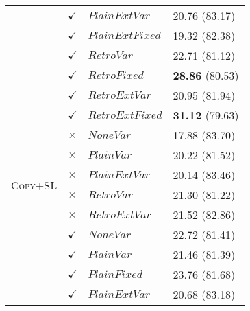 \begin{table}
\begin{tabular}{|l|l|l|l| }
 & $\checkmark$ & $PlainExtVar$  & 20.76 (83.17) \\
 & $\checkmark$ & $PlainExtFixed$  & 19.32 (82.38) \\
 & $\checkmark$ & $RetroVar$ &  22.71 (81.12) \\
 & $\checkmark$ & $RetroFixed$ &  \textbf{28.86} (80.53) \\
 & $\checkmark$ & $RetroExtVar$  & 20.95 (81.94) \\
 & $\checkmark$ & $RetroExtFixed$  & \textbf{31.12} (79.63) \\
 \hline
\multirow{6}{*}{\textsc{Copy+SL}} & $\times$ & $NoneVar$ & 17.88 (83.70) \\
& $\times$ & $PlainVar$ & 20.22 (81.52) \\
 & $\times$ & $PlainExtVar$  & 20.14 (83.46) \\   
 & $\times$ & $RetroVar$ &  21.30 (81.22) \\ 
 & $\times$ & $RetroExtVar$  & 21.52 (82.86) \\ 
 & $\checkmark$ & $NoneVar$ &  22.72 (81.41) \\
 & $\checkmark$ & $PlainVar$ &  21.46 (81.39) \\ 
 & $\checkmark$ & $PlainFixed$ &  23.76 (81.68) \\
 & $\checkmark$ & $PlainExtVar$  & 20.68 (83.18) \\

\end{tabular}
\end{table}
